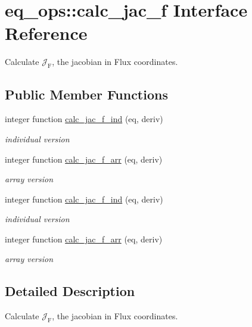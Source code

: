 \hypertarget{interfaceeq__ops_1_1calc__jac__f}{}\section{eq\+\_\+ops\+:\+:calc\+\_\+jac\+\_\+f Interface Reference}
\label{interfaceeq__ops_1_1calc__jac__f}


Calculate $\mathcal{J}_\text{F}$, the jacobian in Flux coordinates.  


\subsection*{Public Member Functions}
\begin{DoxyCompactItemize}
\item 
integer function \hyperlink{interfaceeq__ops_1_1calc__jac__f_a265d2f943889de6632d835c5eeafc639}{calc\+\_\+jac\+\_\+f\+\_\+ind} (eq, deriv)
\begin{DoxyCompactList}\small\item\em individual version \end{DoxyCompactList}\item 
integer function \hyperlink{interfaceeq__ops_1_1calc__jac__f_a0ede3ce8b9c24ad484b96f197e191d7b}{calc\+\_\+jac\+\_\+f\+\_\+arr} (eq, deriv)
\begin{DoxyCompactList}\small\item\em array version \end{DoxyCompactList}\item 
integer function \hyperlink{interfaceeq__ops_1_1calc__jac__f_a265d2f943889de6632d835c5eeafc639}{calc\+\_\+jac\+\_\+f\+\_\+ind} (eq, deriv)
\begin{DoxyCompactList}\small\item\em individual version \end{DoxyCompactList}\item 
integer function \hyperlink{interfaceeq__ops_1_1calc__jac__f_a0ede3ce8b9c24ad484b96f197e191d7b}{calc\+\_\+jac\+\_\+f\+\_\+arr} (eq, deriv)
\begin{DoxyCompactList}\small\item\em array version \end{DoxyCompactList}\end{DoxyCompactItemize}


\subsection{Detailed Description}
Calculate $\mathcal{J}_\text{F}$, the jacobian in Flux coordinates. 

